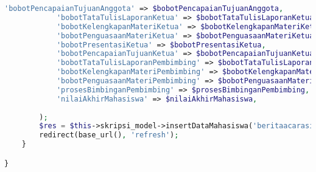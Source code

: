 \begin{lstlisting}[language=PHP,basicstyle=\tiny,caption=C\_skripsi.php]
			'bobotPencapaianTujuanAnggota' => $bobotPencapaianTujuanAnggota,
			'bobotTataTulisLaporanKetua' => $bobotTataTulisLaporanKetua,
			'bobotKelengkapanMateriKetua' => $bobotKelengkapanMateriKetua,
			'bobotPenguasaanMateriKetua' => $bobotPenguasaanMateriKetua,
			'bobotPresentasiKetua' => $bobotPresentasiKetua,
			'bobotPencapaianTujuanKetua' => $bobotPencapaianTujuanKetua,
			'bobotTataTulisLaporanPembimbing' => $bobotTataTulisLaporanPembimbing,
			'bobotKelengkapanMateriPembimbing' => $bobotKelengkapanMateriPembimbing,
			'bobotPenguasaanMateriPembimbing' => $bobotPenguasaanMateriPembimbing,
			'prosesBimbinganPembimbing' => $prosesBimbinganPembimbing,
			'nilaiAkhirMahasiswa' => $nilaiAkhirMahasiswa,
		
		);
		$res = $this->skripsi_model->insertDataMahasiswa('beritaacarasidangskripsi',$data_insert);
		redirect(base_url(), 'refresh');
	}

}

\end{lstlisting}

